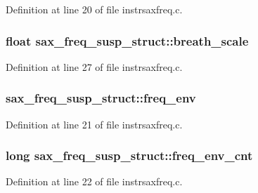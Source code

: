 Definition at line 20 of file instrsaxfreq.\+c.

\subsubsection[{\texorpdfstring{breath\+\_\+scale}{breath_scale}}]{\setlength{\rightskip}{0pt plus 5cm}float sax\+\_\+freq\+\_\+susp\+\_\+struct\+::breath\+\_\+scale}\hypertarget{structsax__freq__susp__struct_adeadf2822895a597d32eb117cdcecbc1}{}\label{structsax__freq__susp__struct_adeadf2822895a597d32eb117cdcecbc1}


Definition at line 27 of file instrsaxfreq.\+c.

\subsubsection[{\texorpdfstring{freq\+\_\+env}{freq_env}}]{ sax\+\_\+freq\+\_\+susp\+\_\+struct\+::freq\+\_\+env}\hypertarget{structsax__freq__susp__struct_a74a15f12e44d2b89f0ad8a21237ab9b9}{}\label{structsax__freq__susp__struct_a74a15f12e44d2b89f0ad8a21237ab9b9}


Definition at line 21 of file instrsaxfreq.\+c.

\subsubsection[{\texorpdfstring{freq\+\_\+env\+\_\+cnt}{freq_env_cnt}}]{\setlength{\rightskip}{0pt plus 5cm}long sax\+\_\+freq\+\_\+susp\+\_\+struct\+::freq\+\_\+env\+\_\+cnt}\hypertarget{structsax__freq__susp__struct_ac7765bad3886ff433a9e463a1555c341}{}\label{structsax__freq__susp__struct_ac7765bad3886ff433a9e463a1555c341}


Definition at line 22 of file instrsaxfreq.\+c.

